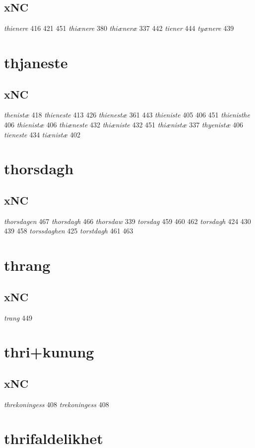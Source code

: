 \documentclass[a4paper,twocolumn]{article}
\begin{document}
\subsection{xNC}
\label{sec:org597dd27}
\emph{thienere} 416 421 451 \emph{thiænere} 380 \emph{thiæneræ} 337 442 \emph{tiener} 444 \emph{tyænere} 439 
\section{thjaneste}
\label{sec:org24280fc}
\subsection{xNC}
\label{sec:orgd0c1654}
\emph{thenistæ} 418 \emph{thieneste} 413 426 \emph{thienestæ} 361 443 \emph{thieniste} 405 406 451 \emph{thienisthe} 406 \emph{thienistæ} 406 \emph{thiæneste} 432 \emph{thiæniste} 432 451 \emph{thiænistæ} 337 \emph{thyenistæ} 406 \emph{tieneste} 434 \emph{tiænistæ} 402 
\section{thorsdagh}
\label{sec:org132cc37}
\subsection{xNC}
\label{sec:orgffa4ecd}
\emph{thorsdagen} 467 \emph{thorsdagh} 466 \emph{thorsdaw} 339 \emph{torsdag} 459 460 462 \emph{torsdagh} 424 430 439 458 \emph{torssdaghen} 425 \emph{torstdagh} 461 463 
\section{thrang}
\label{sec:orge562470}
\subsection{xNC}
\label{sec:org6c4263b}
\emph{trang} 449 
\section{thri+kunung}
\label{sec:orga975e2d}
\subsection{xNC}
\label{sec:org571aa0d}
\emph{threkoningess} 408 \emph{trekoningess} 408 
\section{thrifaldelikhet}
\label{sec:orgc61528c}
\end{document}
